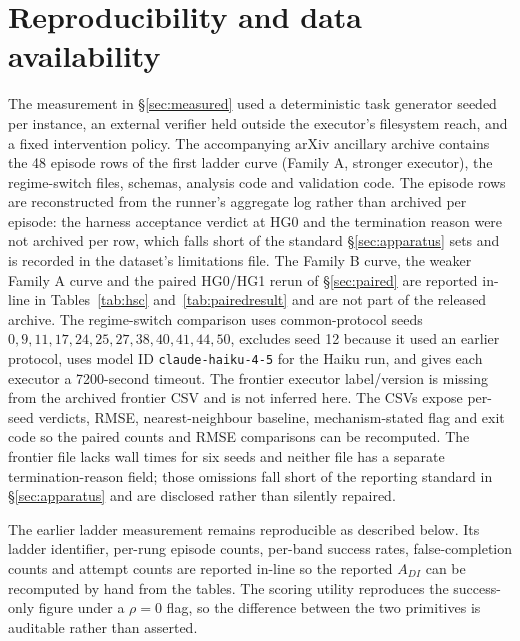 \section*{Reproducibility and data availability}

The measurement in \S\ref{sec:measured} used a deterministic task generator seeded per instance, an external verifier held outside the executor's filesystem reach, and a fixed intervention policy. The accompanying arXiv ancillary archive  contains the 48 episode rows of the first ladder curve (Family A, stronger executor), the regime-switch files, schemas, analysis code and validation code. The episode rows are reconstructed from the runner's aggregate log rather than archived per episode: the harness acceptance verdict at HG0 and the termination reason were not archived per row, which falls short of the standard \S\ref{sec:apparatus} sets and is recorded in the dataset's limitations file. The Family B curve, the weaker Family A curve and the paired HG0/HG1 rerun of \S\ref{sec:paired} are reported in-line in Tables~\ref{tab:hsc} and~\ref{tab:pairedresult} and are not part of the released archive. The regime-switch comparison uses common-protocol seeds $0,9,11,17,24,25,27,38,40,41,44,50$, excludes seed 12 because it used an earlier protocol, uses model ID \texttt{claude-haiku-4-5} for the Haiku run, and gives each executor a 7200-second timeout. The frontier executor label/version is missing from the archived frontier CSV and is not inferred here. The CSVs expose per-seed verdicts, RMSE, nearest-neighbour baseline, mechanism-stated flag and exit code so the paired counts and RMSE comparisons can be recomputed. The frontier file lacks wall times for six seeds and neither file has a separate termination-reason field; those omissions fall short of the reporting standard in \S\ref{sec:apparatus} and are disclosed rather than silently repaired.

The earlier ladder measurement remains reproducible as described below. Its ladder identifier, per-rung episode counts, per-band success rates, false-completion counts and attempt counts are reported in-line so the reported $A_{DI}$ can be recomputed by hand from the tables. The scoring utility reproduces the success-only figure under a $\rho = 0$ flag, so the difference between the two primitives is auditable rather than asserted.

